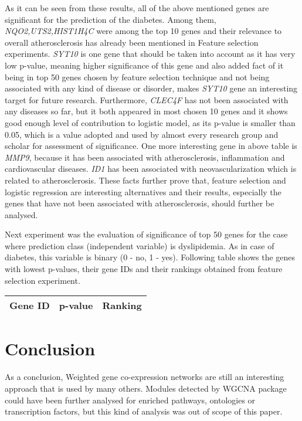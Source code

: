 \documentclass{ba-kecs}
\numberwithin{figure}{section}
\numberwithin{equation}{section}
\begin{document}
As it can be seen from these results, all of the above mentioned genes are significant for the prediction of the diabetes. Among them, \textit{NQO2,UTS2,HIST1H4C} were among the top 10 genes and their relevance to overall atherosclerosis has already been mentioned in Feature selection experiments. \textit{SYT10} is one gene that should be taken into account as it has very low p-value, meaning higher significance of this gene and also added fact of it being in top 50 genes chosen by feature selection technique and not being associated with any kind of disease or disorder, makes \textit{SYT10} gene an interesting target for future research. Furthermore, \textit{CLEC4F} has not been associated with any diseases so far, but it both appeared in most chosen 10 genes and it shows good enough level of contribution to logistic model, as its p-value is smaller than 0.05, which is a value adopted and used by almost every research group and scholar for assessment of significance. One more interesting gene in above table is \textit{MMP9}, because it has been associated with atherosclerosis, inflammation and cardiovascular diseases. \textit{ID1} has been associated with neovascularization which is related to atherosclerosis. These facts further prove that, feature selection and logistic regression are interesting alternatives and their results, especially the genes that have not been associated with atherosclerosis, should further be analysed.

Next experiment was the evaluation of significance of top 50 genes for the case where prediction class (independent variable) is dyslipidemia. As in case of diabetes, this variable is binary (0 - no, 1 - yes). Following table shows the genes with lowest p-values, their gene IDs and their rankings obtained from feature selection experiment.
\begin{center}
\begin{tabular}{|l|l|l|}
Gene ID & p-value & Ranking \\ \hline
\hline
\end{tabular}
\end{center}

\section{Conclusion}

As a conclusion, Weighted gene co-expression networks are still an interesting approach that is used by many others. Modules detected by WGCNA package could have been further analysed for enriched pathways, ontologies or transcription factors, but this kind of analysis was out of scope of this paper.
\end{document}
